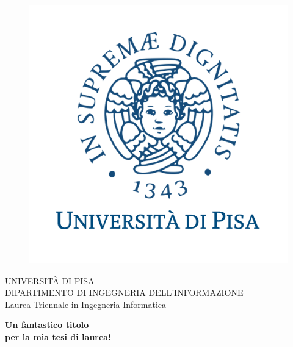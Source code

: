 \begin{titlepage}
\begin{figure}[!htb]
    \centering
    \includegraphics[keepaspectratio=true,scale=0.5]{format/img/unipi.png}
\end{figure}

\begin{center}
    \LARGE{UNIVERSITÀ DI PISA}
    \vspace{5mm}
    \\ \large{DIPARTIMENTO DI INGEGNERIA DELL'INFORMAZIONE}
    \vspace{5mm}
    \\ \LARGE{Laurea Triennale in Ingegneria Informatica}
\end{center}

\vspace{15mm}
\begin{center}
    {\LARGE{\bf Un fantastico titolo\\ \vspace{5mm} per la mia tesi di laurea! }}
    
    
\end{center}
\vspace{30mm}


\end{titlepage}
